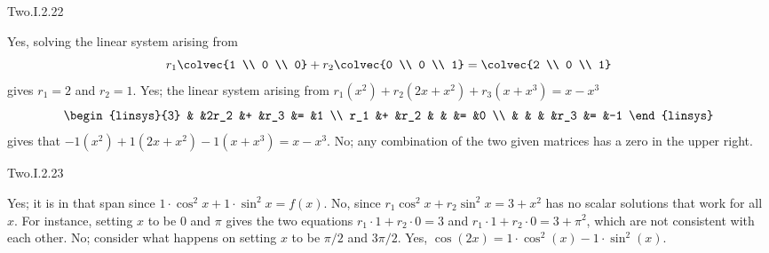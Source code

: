 \begin{ans}{Two.I.2.22}
      \begin{exparts}
         \partsitem Yes, solving the linear system arising from
           \begin{equation*}
             r_1\colvec{1 \\ 0 \\ 0}+r_2\colvec{0 \\ 0 \\ 1}
               =\colvec{2 \\ 0 \\ 1}
           \end{equation*}
           gives \( r_1=2 \) and \( r_2=1 \).
         \partsitem Yes; the linear system arising from
           \( r_1(x^2)+r_2(2x+x^2)+r_3(x+x^3)=x-x^3 \)
           \begin{equation*}
             \begin{linsys}{3}
                   &  &2r_2 &+ &r_3 &= &1  \\
               r_1 &+ &r_2  &  &    &= &0  \\
                   &  &     &  &r_3 &= &-1
             \end{linsys}
           \end{equation*}
           gives that \( -1(x^2)+1(2x+x^2)-1(x+x^3)=x-x^3 \).
        \partsitem No; any combination of the two given matrices has a zero
           in the upper right.
      \end{exparts}
    
\end{ans}
\begin{ans}{Two.I.2.23}
      \begin{exparts}
        \partsitem Yes; it is in that span since
          \( 1\cdot\cos^2x+1\cdot\sin^2x=f(x) \).
        \partsitem No, since \( r_1\cos^2x+r_2\sin^2x=3+x^2 \) has no scalar
          solutions that work for all \( x \).
          For instance, setting $x$ to be $0$ and $\pi$ gives the two
          equations $r_1\cdot 1+r_2\cdot 0=3$ and
          $r_1\cdot 1+r_2\cdot 0=3+\pi^2$, which are not consistent with each
          other.
        \partsitem No; consider what happens on setting $x$ to be $\pi/2$ and
          $3\pi/2$.
        \partsitem Yes, \( \cos (2x)=1\cdot\cos^2(x)-1\cdot\sin^2(x) \).
      \end{exparts}
     
\end{ans}
